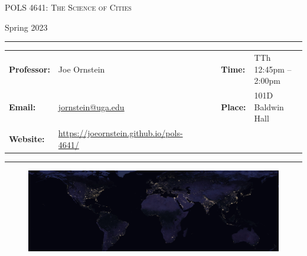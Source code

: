 \documentclass[11pt, letterpaper]{article}
\begin{document}
\begin{center}
{\Large \textsc{POLS 4641: The Science of Cities}}
\end{center}
\begin{center}
{\large Spring 2023}
\end{center}

\begin{center}
\rule{6.5in}{0.4pt}
\begin{minipage}[t]{.96\textwidth}
\begin{tabular}{llcccll}
\textbf{Professor:} & Joe Ornstein & & &  & \textbf{Time:} & TTh 12:45pm -- 2:00pm \\
\textbf{Email:} &  \href{mailto:jornstein@uga.edu}{jornstein@uga.edu} & & & & \textbf{Place:} & 101D Baldwin Hall\\
\textbf{Website:} & \href{https://joeornstein.github.io/pols-4641/}{https://joeornstein.github.io/pols-4641/} & & & & &
\end{tabular}
\end{minipage}
\rule{6.5in}{0.4pt}
\end{center}
\vspace{.15cm}
\setlength{\unitlength}{1in}
\renewcommand{\arraystretch}{2}

\begin{figure}[h]
	\centering
	\includegraphics[width = 1.03\textwidth]{img/night-lights-cropped.jpg}
\end{figure}


\onehalfspacing

\end{document}
